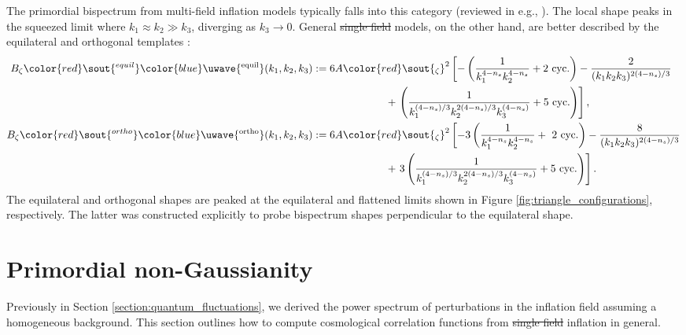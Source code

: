 \documentclass[a4paper,12pt,times,custombib,print,index]{Classes/PhDThesisPSnPDF} %
\providecommand{\DIFadd}[1]{{\protect\color{blue}\uwave{#1}}} %
\providecommand{\DIFdel}[1]{{\protect\color{red}\sout{#1}}}                      %
\providecommand{\DIFaddbegin}{} %
\providecommand{\DIFaddend}{} %
\providecommand{\DIFdelbegin}{} %
\providecommand{\DIFdelend}{} %
\newcommand{\DIFscaledelfig}{0.5}
\newlength{\DIFdelgraphicswidth} %
\newlength{\DIFdelgraphicsheight} %
\newcommand{\DIFaddincludegraphics}[2][]{{\color{blue}\fbox{\DIFOincludegraphics[#1]{#2}}}} %
\newcommand{\DIFdelincludegraphics}[2][]{%
\sbox{\DIFdelgraphicsbox}{\DIFOincludegraphics[#1]{#2}}%
\settoboxwidth{\DIFdelgraphicswidth}{\DIFdelgraphicsbox} %
\settoboxtotalheight{\DIFdelgraphicsheight}{\DIFdelgraphicsbox} %
\scalebox{\DIFscaledelfig}{%
\parbox[b]{\DIFdelgraphicswidth}{\usebox{\DIFdelgraphicsbox}\\[-\baselineskip] \rule{\DIFdelgraphicswidth}{0em}}\llap{\resizebox{\DIFdelgraphicswidth}{\DIFdelgraphicsheight}{%
\setlength{\unitlength}{\DIFdelgraphicswidth}%
\begin{picture}(1,1)%
\thicklines\linethickness{2pt} %
{\color[rgb]{1,0,0}\put(0,0){\framebox(1,1){}}}%
{\color[rgb]{1,0,0}\put(0,0){\line( 1,1){1}}}%
{\color[rgb]{1,0,0}\put(0,1){\line(1,-1){1}}}%
\end{picture}%
}\hspace*{3pt}}} %
} %
\DeclareRobustCommand{\DIFaddbegin}{\DIFOaddbegin \let\includegraphics\DIFaddincludegraphics} %
\DeclareRobustCommand{\DIFaddend}{\DIFOaddend \let\includegraphics\DIFOincludegraphics} %
\DeclareRobustCommand{\DIFdelbegin}{\DIFOdelbegin \let\includegraphics\DIFdelincludegraphics} %
\DeclareRobustCommand{\DIFdelend}{\DIFOaddend \let\includegraphics\DIFOincludegraphics} %
\begin{document}
The primordial bispectrum from multi-field inflation models typically falls into this category (reviewed in e.g., \cite{Byrnes2010review}). The local shape peaks in the squeezed limit where ${k_1 \approx k_2 \gg k_3}$, diverging as $k_3\rightarrow0$. General \DIFdelbegin \DIFdel{single field }\DIFdelend \DIFaddbegin \DIFadd{single-field }\DIFaddend models, on the other hand, are better described by the equilateral and orthogonal templates \cite{Creminelli2006limits,Senatore2010orthogonal}:
\begin{align}
	B_\zeta\DIFdelbegin \DIFdel{^{equil} }\DIFdelend \DIFaddbegin \DIFadd{^\textrm{equil} }\DIFaddend (k_1, k_2, k_3) &:= 6A\DIFdelbegin \DIFdel{_\zeta}\DIFdelend ^2 \left[ -\left( \frac{1}{k_1^{4-n_s} k_2^{4-n_s}} + \text{2 cyc.} \right) -\frac{2}{(k_1 k_2 k_3)^{2(4-n_s)/3}} \right.\nonumber\\
	&\hspace{0.2\textwidth} + \left. \left( \frac{1}{k_1^{(4-n_s)/3} k_2^{2(4-n_s)/3} k_3^{(4-n_s)}} + \text{5 cyc.} \right) \right], \label{def:equilateral_template} \\
	B_\zeta\DIFdelbegin \DIFdel{^{ortho} }\DIFdelend \DIFaddbegin \DIFadd{^\textrm{ortho} }\DIFaddend (k_1, k_2, k_3) &:= 6A\DIFdelbegin \DIFdel{_\zeta}\DIFdelend ^2 \left[ -3\left( \frac{1}{k_1^{4-n_s} k_2^{4-n_s}} + \text{ 2 cyc.} \right) -\frac{8}{(k_1 k_2 k_3)^{2(4-n_s)/3}} \right.\nonumber\\
	&\hspace{0.2\textwidth} + \left. 3\left( \frac{1}{k_1^{(4-n_s)/3} k_2^{2(4-n_s)/3} k_3^{(4-n_s)}} + \text{5 cyc.} \right) \right]. \label{def:orthogonal_template} 
\end{align}
The equilateral and orthogonal shapes are peaked at the equilateral and flattened limits shown in Figure \ref{fig:triangle_configurations}, respectively. The latter was constructed explicitly to probe bispectrum shapes perpendicular to the equilateral shape.

\section{Primordial non-Gaussianity} \label{section:primordial_non_Gaussianity}

Previously in Section \ref{section:quantum_fluctuations}, we derived the power spectrum of perturbations in the inflation field assuming a homogeneous background. This section outlines how to compute cosmological correlation functions from \DIFdelbegin \DIFdel{single field }\DIFdelend \DIFaddbegin \DIFadd{single-field }\DIFaddend inflation in general.
\end{document}
